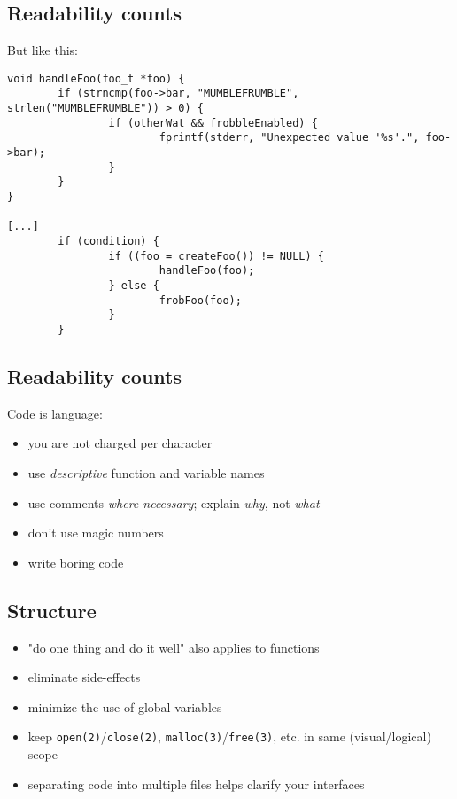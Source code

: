 \documentclass[xga]{xdvislides}
\begin{document}
\subsection{Readability counts}
But like this:
\begin{verbatim}
void handleFoo(foo_t *foo) {
        if (strncmp(foo->bar, "MUMBLEFRUMBLE", strlen("MUMBLEFRUMBLE")) > 0) {
                if (otherWat && frobbleEnabled) {
                        fprintf(stderr, "Unexpected value '%s'.", foo->bar);
                }
        }
}

[...]
        if (condition) {
                if ((foo = createFoo()) != NULL) {
                        handleFoo(foo);
                } else {
                        frobFoo(foo);
                }
        }
\end{verbatim}


\subsection{Readability counts}
Code is language:
\begin{itemize}
	\item you are not charged per character
	\item use {\em descriptive} function and variable names
	\item use comments {\em where necessary}; explain {\em why}, not {\em what}
	\item don't use magic numbers
	\item write boring code
\end{itemize}

\subsection{Structure}
\begin{itemize}
	\item "do one thing and do it well" also applies to functions
	\item eliminate side-effects
	\item minimize the use of global variables
	\item keep \verb+open(2)+/\verb+close(2)+, \verb+malloc(3)+/\verb+free(3)+,
		etc. in same (visual/logical) scope
	\item separating code into multiple files helps clarify your interfaces
\end{itemize}
\end{document}
